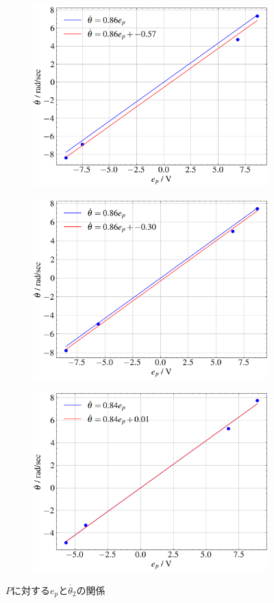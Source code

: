 \begin{figure}
	\centering
	\begin{subfigure}{0.48\columnwidth}
		\centering
		\includegraphics[width=0.8\linewidth]{src/figures/theta_dot-e_p-relation/theta_dot-e_p-relation-P60.png}
	\end{subfigure}
	\begin{subfigure}{0.48\columnwidth}
		\centering
		\includegraphics[width=0.8\linewidth]{src/figures/theta_dot-e_p-relation/theta_dot-e_p-relation-P80.png}
	\end{subfigure}
	\begin{subfigure}{0.48\columnwidth}
		\centering
		\includegraphics[width=0.8\linewidth]{src/figures/theta_dot-e_p-relation/theta_dot-e_p-relation-P100.png}
	\end{subfigure}
	\caption{$P$に対する$e_p$と$\dot{\theta_2}$の関係}\label{fig:theta_dot-e_p-relation}
\end{figure}
